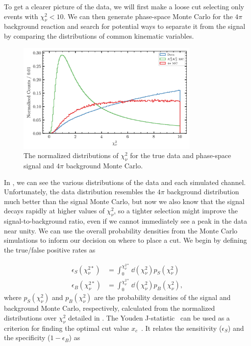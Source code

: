 To get a clearer picture of the data, we will first make a loose cut selecting only events with $\chi^2_\nu < 10$. We can then generate phase-space Monte Carlo for the $4\pi$ background reaction and search for potential ways to separate it from the signal by comparing the distributions of common kinematic variables.

\begin{figure}
  \begin{center}
    \includegraphics[width=0.8\textwidth]{figures/data_combined_chisqdof.png}
  \end{center}
  \caption{The normalized distributions of $\chi^2_\nu$ for the true data and phase-space signal and $4\pi$ background Monte Carlo.}\label{fig:data-combined-chisqdof}
\end{figure}

In , we can see the various distributions of the data and each simulated channel. Unfortunately, the data distribution resembles the $4\pi$ background distribution much better than the signal Monte Carlo, but now we also know that the signal decays rapidly at higher values of $\chi^2_\nu$, so a tighter selection might improve the signal-to-background ratio, even if we cannot immediately see a peak in the data near unity. We can use the overall probability densities from the Monte Carlo simulations to inform our decision on where to place a cut. We begin by defining the true/false positive rates as

\begin{align}
  \epsilon_S(\chi^{2*}_\nu) &= \int_0^{\chi^{2*}_\nu} \dd{(\chi^2_\nu)} p_S(\chi^2_\nu) \\
  \epsilon_B(\chi^{2*}_\nu) &= \int_0^{\chi^{2*}_\nu} \dd{(\chi^2_\nu)} p_B(\chi^2_\nu),
\end{align}
where $p_S(\chi^2_\nu)$ and $p_B(\chi^2_\nu)$ are the probability densities of the signal and background Monte Carlo, respectively, calculated from the normalized distributions over $\chi^2_\nu$ detailed in . The Youden J-statistic~\cite{Peirce1884,Youden1950} can be used as a criterion for finding the optimal cut value $x_c$~\cite{Schisterman2005,Powers2020}. It relates the sensitivity ($\epsilon_S$) and the specificity ($1-\epsilon_B$) as

